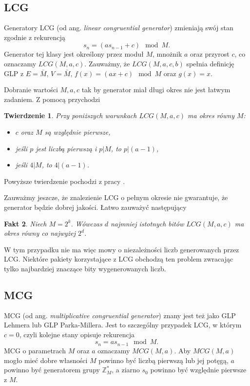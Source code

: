 \documentclass[a4paper,11pt,twoside]{book}
\newtheorem{twier}{Twierdzenie}[chapter]
\newtheorem{fakt}[twier]{Fakt}
\theoremstyle{definition}
\begin{document}
\subsection*{LCG}
Generatory LCG (od ang. \textit{linear congruential generator}) zmieniają swój stan zgodnie z rekurencją
\begin{equation}
 \label{eq:lcg}
 s_n = (a s_{n-1} + c) \mod M.
\end{equation}
Generator tej klasy jest określony przez moduł $M$, mnożnik $a$ oraz przyrost $c$, co oznaczamy $LCG(M,a,c)$. Zauważmy, że $LCG(M,a,c,b)$ spełnia definicję GLP z $E = \bar{M}$, $V = \bar{M}$, $f(x) = (a x + c) \mod M$ oraz $g(x) = x$.

Dobranie wartości $M, a, c$ tak by generator miał długi okres nie jest łatwym zadaniem. Z pomocą przychodzi
\begin{twier}
  Przy poniższych warunkach $LCG(M,a,c)$ ma okres równy $M$:
  \begin{itemize}
   \item $c$ oraz $M$ są względnie pierwsze,
   \item jeśli $p$ jest liczbą pierwszą i $p | M$, to $p |(a - 1)$,
   \item jeśli $4 | M$, to $4 |(a-1)$.
  \end{itemize}
\end{twier}
\noindent Powyższe twierdzenie pochodzi z pracy \cite{hull}.

Zauważmy jeszcze, że znalezienie LCG o pełnym okresie nie gwarantuje, że generator będzie dobrej jakości. Łatwo zauważyć następujący
\begin{fakt}
 Niech $M = 2^k$. Wówczas $d$ najmniej istotnych bitów $LCG(M,a,c)$ ma okres równy co najwyżej $2^d$.
\end{fakt}
\noindent W tym przypadku nie ma więc mowy o niezależności liczb generowanych przez LCG. Niektóre pakiety korzystające z LCG obchodzą ten problem zwracając tylko najbardziej znaczące bity wygenerowanych liczb.

\subsection*{MCG}
MCG (od ang. \textit{multiplicative congruential generator}) znany jest też jako GLP Lehmera lub GLP Parka-Millera. 
Jest to szczególny przypadek LCG, w którym $c = 0$, czyli kolejne stany opisuje rekurencja
\begin{equation}
 \label{eq:mcg}
 s_n = a s_{n-1} \mod M.
\end{equation}
MCG o parametrach $M$ oraz $a$ oznaczamy $MCG(M, a)$. Aby $MCG(M,a)$ mogło mieć dobre własności $M$ powinno być liczbą pierwszą lub jej potęgą, $a$ powinno być generatorem grupy $\mathbb{Z}_M^*$, a ziarno $s_0$ powinno być względnie pierwsze z $M$. 
\end{document}
